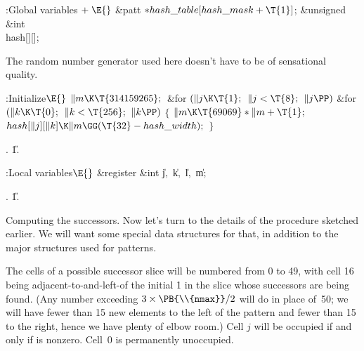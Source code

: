 \B{}:Global variables\X${}\mathrel+\E{}$\6
\&{patt} ${}{*}\\{hash\_table}[\\{hash\_mask}+\T{1}]{}$;\6
\&{unsigned} \&{int} \\{hash}[][];\par
\fi

The random number generator used here doesn't have to be
of sensational
quality.

\Y\B\4:Initialize\X${}\E{}$\6
$\|m\K\T{314159265};{}$\6
\&{for} ${}(\|j\K\T{1};{}$ ${}\|j<\T{8};{}$ ${}\|j\PP){}$\1\6
\&{for} ${}(\|k\K\T{0};{}$ ${}\|k<\T{256};{}$ ${}\|k\PP){}$\5
${}\{{}$\1\6
${}\|m\K\T{69069}*\|m+\T{1};{}$\6
${}\\{hash}[\|j][\|k]\K\|m\GG(\T{32}-\\{hash\_width});{}$\6
\4${}\}{}$\2\2\par
{}.
\U1.\fi

\B{}:Local variables\X${}\E{}$\6
\&{register} \&{int} \|j${},{}$ \|k${},{}$ \|l${},{}$ \|m;\par
{}.
\U1.\fi

Computing the successors. Now let's turn to the
details of the
procedure sketched earlier. We will want some special data structures
for that, in addition to the major structures used for patterns.

The cells of a possible successor slice will be numbered from 0 to 49,
with cell 16 being adjacent-to-and-left-of the initial \.1 in the
slice whose successors are being found. (Any number exceeding
$3\times\PB{\\{nmax}}/2$ will do in place of~50; we will have fewer than
15 new elements to the left of the pattern and fewer than 15 to the right,
hence we have plenty of elbow room.) Cell $j$ will be occupied if and only if
 is nonzero. Cell~0 is permanently unoccupied.

